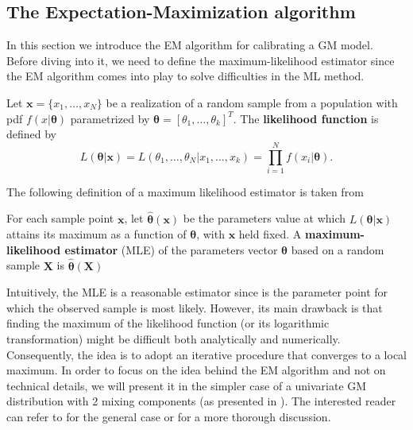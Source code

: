 \subsection{The Expectation-Maximization algorithm}\label{subsec:EM}
In this section we introduce the \gls{EM} algorithm for calibrating a \gls{GM} model. Before diving into it, we need to define the maximum-likelihood estimator since the \gls{EM} algorithm comes into play to solve difficulties in the \gls{ML} method.
\begin{definition}
	Let $\bm{x}=\{x_1,\ldots,x_N\}$ be a realization of a random sample from a population with pdf $f(x\lvert\bm{\theta})$ parametrized by $\bm{\theta}=[\theta_1,\ldots,\theta_k]^T$. The \textbf{likelihood function} is defined by \[ L(\bm{\theta}\lvert\bm{x}) = L(\theta_1,\ldots,\theta_N\lvert x_1,\ldots,x_k) = \prod_{i=1}^{N}f(x_i\lvert\bm{\theta}). \]	
\end{definition}
The following definition of a maximum likelihood estimator is taken from \cite{casella2002}
\begin{definition}
	For each sample point $\bm{x}$, let $\widehat{\bm{\theta}}(\bm{x})$ be the parameters value at which $L(\bm{\theta}\lvert\bm{x})$  attains its maximum as a function of $\bm{\theta}$, with $\bm{x}$ held fixed. A \textbf{maximum-likelihood estimator} (MLE) of the parameters vector $\bm{\theta}$ based on a random sample $\bm{X}$ is $\widehat{\bm{\theta}}(\bm{X})$
\end{definition}
Intuitively, the MLE is a reasonable estimator since is the parameter point for which the observed sample is most likely. However, its main drawback is that finding the maximum of the likelihood function (or its logarithmic transformation) might be difficult both analytically and numerically. Consequently, the idea is to adopt an iterative procedure that converges to a local maximum.
In order to focus on the idea behind the EM algorithm and not on technical details, we will present it in the simpler case of a univariate GM distribution with 2 mixing components (as presented in \cite{hastie2009}). The interested reader can refer to \cite{hastie2009} for the general case or \cite{Plasse2013} for a more thorough discussion.

